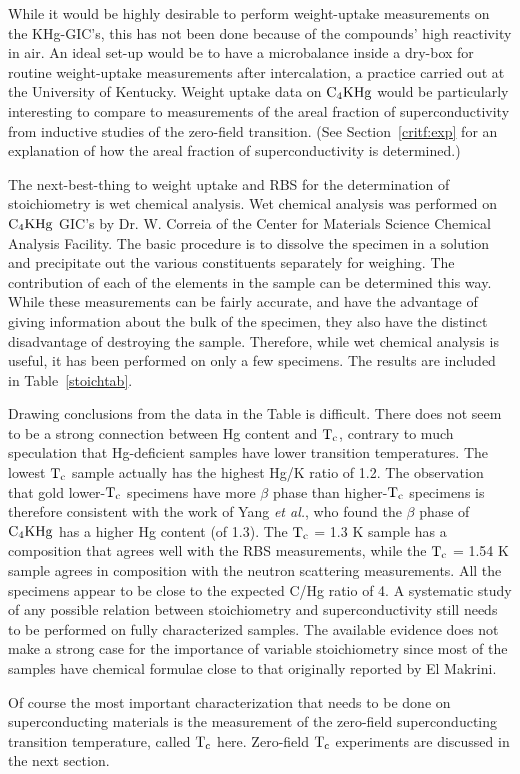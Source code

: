         While  it  would   be   highly  desirable  to perform weight-uptake
measurements on the   KHg-GIC's, this  has not been   done  because of  the
compounds'  high reactivity  in air.  An ideal  set-up would  be to  have a
microbalance inside a dry-box for routine weight-uptake  measurements after
intercalation,   a  practice    carried   out    at  the  University     of
Kentucky.\cite{doll86}   Weight uptake  data   on   $\rm  C_4KHg$ would  be
particularly interesting to  compare  to measurements of the areal fraction
of superconductivity from inductive studies  of  the zero-field transition.
(See  Section~\ref{critf:exp} for an  explanation of how the areal
fraction of superconductivity is determined.)

        The next-best-thing to weight uptake and RBS  for the determination
of  stoichiometry is  wet chemical  analysis.   Wet  chemical analysis  was
performed on  $\rm C_4KHg$ GIC's  by Dr.  W.   Correia  of  the  Center for
Materials Science  Chemical Analysis Facility.   The  basic procedure is to
dissolve the specimen  in   a   solution and  precipitate out  the  various
constituents  separately  for weighing.  The  contribution   of each of the
elements  in the  sample  can   be  determined   this way.     While  these
measurements  can  be fairly  accurate, and  have the advantage  of  giving
information about the  bulk of the specimen, they  also  have the  distinct
disadvantage of  destroying  the sample.    Therefore, while  wet  chemical
analysis is useful,  it has  been performed on  only a  few specimens.  The
results are included in Table~\ref{stoichtab}. 

        Drawing conclusions from the data in the Table is difficult.  There
does not seem to  be a strong connection  between Hg content and $\rm T_c$,
contrary  to much    speculation  that  Hg-deficient   samples  have  lower
transition temperatures.\cite{H242}  The  lowest $\rm T_c$  sample actually
has the  highest Hg/K ratio  of  1.2.  The observation that gold lower-$\rm
T_c$ specimens have  more $\beta$ phase than higher-$\rm  T_c$ specimens is
therefore      consistent   with    the      work  of    Yang    {\em    et
al.\/},\cite{yang84,yang88} who found the $\beta$ phase of $\rm C_4KHg$ has
a higher Hg  content  (of  1.3).  The  $\rm T_c$  =  1.3  K  sample has   a
composition that agrees well with the RBS measurements, while the $\rm T_c$
=  1.54  K   sample agrees  in   composition   with  the neutron scattering
measurements.  All  the specimens appear to  be  close to the expected C/Hg
ratio   of  4.  A  systematic study   of   any possible   relation  between
stoichiometry and  superconductivity  still needs to  be performed on fully
characterized samples.  The available evidence  does not make a strong case
for the importance of variable stoichiometry since most of the samples have
chemical   formulae    close    to    that    originally reported   by   El
Makrini.\cite{elmakrini80}

        Of course the most important characterization that needs to be done
on  superconducting materials  is    the   measurement  of  the  zero-field
superconducting transition temperature, called $\rm T_c$  here.  Zero-field
$\rm T_c$ experiments are discussed in the next section.
